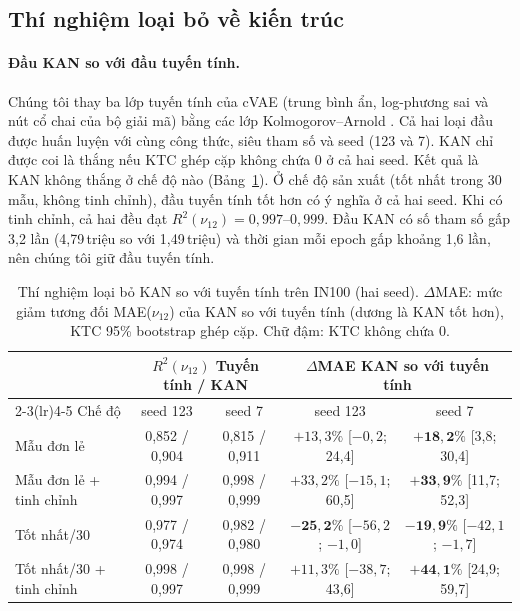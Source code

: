 \documentclass[a4paper,11pt]{article}
\newcommand{\nuot}{\nu_{12}}
\newcommand{\RR}{R^2}
\begin{document}
\subsection{Thí nghiệm loại bỏ về kiến trúc}

\paragraph{Đầu KAN so với đầu tuyến tính.}
Chúng tôi thay ba lớp tuyến tính của cVAE (trung bình ẩn, log-phương sai và
nút cổ chai của bộ giải mã) bằng các lớp Kolmogorov--Arnold
\citep{liu2024kan}. Cả hai loại đầu được huấn luyện với cùng công thức, siêu
tham số và seed (123 và 7). KAN chỉ được coi là thắng nếu KTC ghép cặp không
chứa 0 ở cả hai seed. Kết quả là KAN không thắng ở chế độ nào
(Bảng~\ref{tab:kan}). Ở chế độ sản xuất (tốt nhất trong 30 mẫu, không tinh
chỉnh), đầu tuyến tính tốt hơn có ý nghĩa ở cả hai seed. Khi có tinh chỉnh,
cả hai đều đạt $\RR(\nuot)=0{,}997$--$0{,}999$. Đầu KAN có số tham số gấp 3,2
lần (4,79\,triệu so với 1,49\,triệu) và thời gian mỗi epoch gấp khoảng 1,6
lần, nên chúng tôi giữ đầu tuyến tính.

\begin{table}[t]
\centering
\caption{Thí nghiệm loại bỏ KAN so với tuyến tính trên IN100 (hai seed).
$\Delta$MAE: mức giảm tương đối MAE($\nuot$) của KAN so với tuyến tính (dương
là KAN tốt hơn), KTC 95\% bootstrap ghép cặp. Chữ đậm: KTC không chứa 0.}
\label{tab:kan}
\small
\setlength{\tabcolsep}{4pt}
\begin{tabular}{lcccc}
\toprule
 & \multicolumn{2}{c}{$\RR(\nuot)$ Tuyến tính / KAN} & \multicolumn{2}{c}{$\Delta$MAE KAN so với tuyến tính}\\
\cmidrule(lr){2-3}\cmidrule(lr){4-5}
Chế độ & seed 123 & seed 7 & seed 123 & seed 7\\
\midrule
Mẫu đơn lẻ                 & 0,852 / 0,904 & 0,815 / 0,911 & $+13{,}3\%$ [$-0{,}2$; 24,4] & $\mathbf{+18{,}2\%}$ [3,8; 30,4]\\
Mẫu đơn lẻ + tinh chỉnh    & 0,994 / 0,997 & 0,998 / 0,999 & $+33{,}2\%$ [$-15{,}1$; 60,5] & $\mathbf{+33{,}9\%}$ [11,7; 52,3]\\
Tốt nhất/30                & 0,977 / 0,974 & 0,982 / 0,980 & $\mathbf{-25{,}2\%}$ [$-56{,}2$; $-1{,}0$] & $\mathbf{-19{,}9\%}$ [$-42{,}1$; $-1{,}7$]\\
Tốt nhất/30 + tinh chỉnh   & 0,998 / 0,997 & 0,998 / 0,999 & $+11{,}3\%$ [$-38{,}7$; 43,6] & $\mathbf{+44{,}1\%}$ [24,9; 59,7]\\
\bottomrule
\end{tabular}
\end{table}
\end{document}
